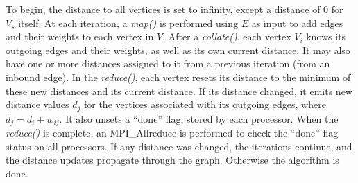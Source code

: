 To begin, the distance to all vertices is set to infinity, except a
distance of 0 for $V_s$ itself.  At each iteration, a {\it map()} is
performed using $E$ as input to add edges and their weights to each
vertex in $V$.  After a {\it collate()}, each vertex $V_i$ knows its
outgoing edges and their weights, as well as its own current distance.
It may also have one or more distances assigned to it from a previous
iteration (from an inbound edge).  In the {\it reduce()}, each vertex
resets its distance to the minimum of these new distances and its
current distance.  If its distance changed, it emits new distance
values $d_j$ for the vertices associated with its outgoing edges,
where $d_j = d_i + w_{ij}$.  It also unsets a ``done'' flag, stored by
each processor.  When the {\it reduce()} is complete, an
MPI\_Allreduce is performed to check the ``done'' flag status on all
processors.  If any distance was changed, the iterations continue, and
the distance updates propagate through the graph.  Otherwise the
algorithm is done.

